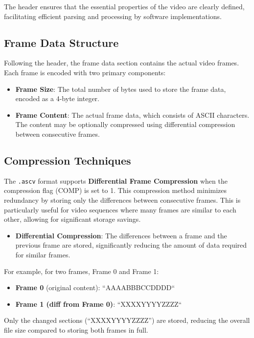 \documentclass{article}
\begin{document}
The header ensures that the essential properties of the video are clearly defined, facilitating efficient parsing and processing by software implementations.

\subsection{Frame Data Structure}

Following the header, the frame data section contains the actual video frames. Each frame is encoded with two primary components:

\begin{itemize}
    \item \textbf{Frame Size}: The total number of bytes used to store the frame data, encoded as a 4-byte integer.
    \item \textbf{Frame Content}: The actual frame data, which consists of ASCII characters. The content may be optionally compressed using differential compression between consecutive frames.
\end{itemize}

\subsection{Compression Techniques}

The \texttt{.ascv} format supports \textbf{Differential Frame Compression} \cite{Frame_Differencing} when the compression flag (COMP) is set to 1. This compression method minimizes redundancy by storing only the differences between consecutive frames. This is particularly useful for video sequences where many frames are similar to each other, allowing for significant storage savings.

\begin{itemize}
    \item \textbf{Differential Compression}: The differences between a frame and the previous frame are stored, significantly reducing the amount of data required for similar frames.
\end{itemize}

For example, for two frames, Frame 0 and Frame 1:
\begin{itemize}
    \item \textbf{Frame 0} (original content): ``AAAABBBCCDDDD``
    \item \textbf{Frame 1 (diff from Frame 0)}: ``XXXXYYYYZZZZ``
\end{itemize}

Only the changed sections (``XXXXYYYYZZZZ'') are stored, reducing the overall file size compared to storing both frames in full.
\end{document}
